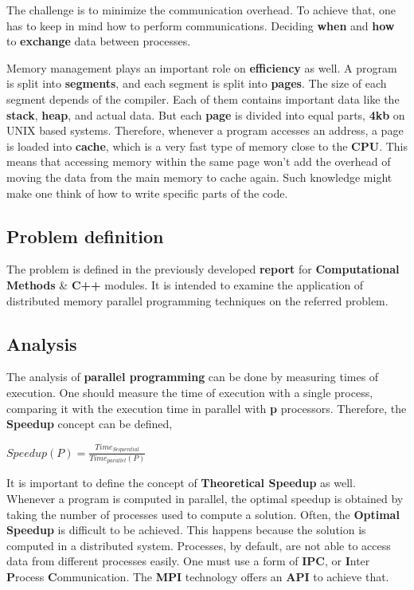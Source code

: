 \documentclass[12pt]{article}
\begin{document}
\par The challenge is to minimize the communication overhead. To achieve that, one has to keep in mind how to perform communications. Deciding \textbf{when} and \textbf{how} to \textbf{exchange} data between processes.

\par Memory management plays an important role on \textbf{efficiency} as well. A program is split into \textbf{segments}, and each segment is split into \textbf{pages}. The size of each segment depends of the compiler. Each of them contains important data like the \textbf{stack}, \textbf{heap}, and actual data. But each \textbf{page} is divided into equal parts, \textbf{4kb} on UNIX based systems. Therefore, whenever a program accesses an address, a page is loaded into \textbf{cache}, which is a very fast type of memory close to the \textbf{CPU}. This means that accessing memory within the same page won't add the overhead of moving the data from the main memory to cache again. Such knowledge might make one think of how to write specific parts of the code.  

\subsection*{Problem definition}

The problem is defined in the previously developed \textbf{report}\cite{fraga} for \textbf{Computational Methods} \& \textbf{C++} modules. It is intended to examine the application of distributed memory parallel programming techniques on the referred problem.

\subsection*{Analysis}
\par The analysis of \textbf{parallel programming} can be done by measuring times of execution. One should measure the time of execution with a single process, comparing it with the execution time in parallel with \textbf{p} processors. Therefore, the \textbf{Speedup} concept can be defined\cite{speedup},
\newline
\begin{center}
$
	Speedup(P) = \frac{Time_{Sequential}}{Time_{parallel}(P)}
$
\end{center}
\hfill
\par It is important to define the concept of \textbf{Theoretical Speedup} as well. Whenever a program is computed in parallel, the optimal speedup is obtained by taking the number of processes used to compute a solution. Often, the \textbf{Optimal Speedup} is difficult to be achieved. This happens because the solution is computed in a distributed system. Processes, by default, are not able to access data from different processes easily. One must use a form of \textbf{IPC}, or \textbf{I}nter \textbf{P}rocess \textbf{C}ommunication. The \textbf{MPI} technology offers an \textbf{API} to achieve that. 
\end{document}
